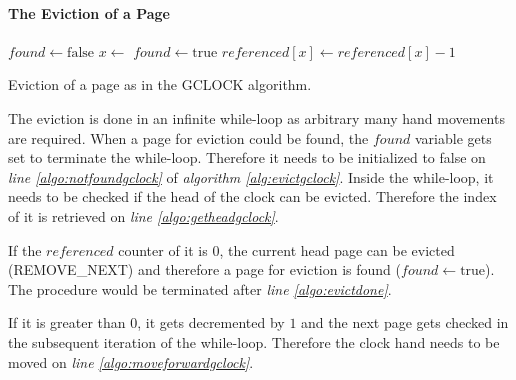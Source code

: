 \paragraph{The Eviction of a Page}

\begin{@empty}
    \begin{algorithm}[ht!]
        \begin{algorithmic}[1]
                \State $found \gets \text{false}$	\label{algo:notfoundgclock}
                    \State $x \gets $	\label{algo:getheadgclock}
                        \State $found \gets \text{true}$
                        \State {}	\label{algo:evictdone}
                    \Else
                        \State $referenced\left[x\right] \gets referenced\left[x\right] - 1$	\label{algo:decrement}
                        \State {}	\label{algo:moveforwardgclock}
                    \EndIf
                \EndWhile
            \EndProcedure
        \end{algorithmic}
        \vspace{.25em}
        \caption{Eviction of a page as in the GCLOCK algorithm.}
        \label{alg:evictgclock}
    \end{algorithm}
\end{@empty}

    The eviction is done in an infinite while-loop as arbitrary many hand movements are required. When a page for eviction could be found, the $found$ variable gets set to terminate the while-loop. Therefore it needs to be initialized to false on \emph{line \ref{algo:notfoundgclock}} of \emph{algorithm \ref{alg:evictgclock}}. Inside the while-loop, it needs to be checked if the head of the clock can be evicted. Therefore the index of it is retrieved on \emph{line \ref{algo:getheadgclock}}.

    If the $referenced$ counter of it is $0$, the current head page can be evicted (REMOVE\_NEXT) and therefore a page for eviction is found ($found \leftarrow \text{true}$). The procedure would be terminated after \emph{line \ref{algo:evictdone}}.

    If it is greater than $0$, it gets decremented by $1$ and the next page gets checked in the subsequent iteration of the while-loop. Therefore the clock hand needs to be moved on \emph{line \ref{algo:moveforwardgclock}}.

